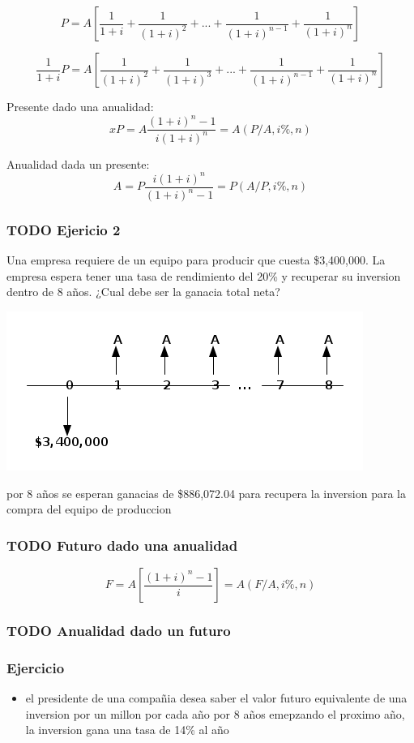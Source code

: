 \documentclass[11pt]{article}
\begin{document}
\[
 P = A\left[ \frac{1}{1+i} + \frac{1}{(1+i)^2} + 
     ... + \frac{1}{(1+i)^{n-1}} + \frac{1}{(1+i)^{n}} 
    \right]  
  \]

\[
\frac{1}{1+i} P = A\left[ \frac{1}{(1+i)^2} + \frac{1}{(1+i)^3} + 
     ... + \frac{1}{(1+i)^{n-1}} + \frac{1}{(1+i)^{n}} 
    \right]  
\]


Presente dado una anualidad:
\[
xP = A\frac{(1+i)^n-1}{i(1+i)^n} = A(P/A, i\%, n)
\]


Anualidad dada un presente:
\[
A = P\frac{i(1+i)^n}{(1+i)^n-1} = P(A/P, i\%, n)
\]

\subsubsection*{{\bfseries\sffamily TODO} Ejericio 2}
\label{sec:org47ca16d}
Una empresa requiere de un equipo para producir que cuesta \$3,400,000. La empresa espera tener una tasa de rendimiento del 20\% y recuperar su inversion dentro de 8 años. ¿Cual debe ser la ganacia total neta?

\begin{center}
\includegraphics[width=.9\linewidth]{fgabvcvn.png}
\end{center}


por 8 años se esperan ganacias de \$886,072.04 para recupera la inversion para la compra del equipo de produccion  

\subsubsection*{{\bfseries\sffamily TODO} Futuro dado una anualidad}
\label{sec:orgbd1acc8}
\[ F=A\left[\frac{(1+i)^n-1}{i}\right] = A(F/A, i\%, n) \]

\subsubsection*{{\bfseries\sffamily TODO} Anualidad dado un futuro}
\label{sec:orgbc75efc}
\subsubsection*{Ejercicio}
\label{sec:org69c0eab}
\begin{itemize}
\item el presidente de una compañia desea saber el valor futuro equivalente de una inversion por un millon por cada año por 8 años emepzando el proximo año, la inversion gana una tasa de 14\% al año
\end{itemize}
\end{document}

